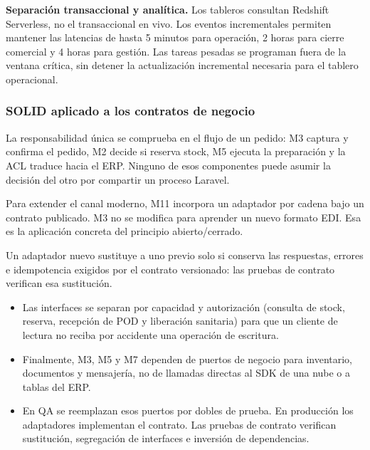 \textbf{Separación transaccional y analítica.} Los tableros consultan Redshift Serverless, no el transaccional en vivo. Los eventos incrementales permiten mantener las latencias de hasta 5 minutos para operación, 2 horas para cierre comercial y 4 horas para gestión. Las tareas pesadas se programan fuera de la ventana crítica, sin detener la actualización incremental necesaria para el tablero operacional.

\subsubsection{SOLID aplicado a los contratos de negocio}

La responsabilidad única se comprueba en el flujo de un pedido: M3 captura y confirma el pedido, M2 decide si reserva stock, M5 ejecuta la preparación y la ACL traduce hacia el ERP. Ninguno de esos componentes puede asumir la decisión del otro por compartir un proceso Laravel.

Para extender el canal moderno, M11 incorpora un adaptador por cadena bajo un contrato publicado. M3 no se modifica para aprender un nuevo formato EDI. Esa es la aplicación concreta del principio abierto/cerrado.

Un adaptador nuevo sustituye a uno previo solo si conserva las respuestas, errores e idempotencia exigidos por el contrato versionado: las pruebas de contrato verifican esa sustitución.

\begin{itemize}
  \item Las interfaces se separan por capacidad y autorización (consulta de stock, reserva, recepción de POD y liberación sanitaria) para que un cliente de lectura no reciba por accidente una operación de escritura.
  \item Finalmente, M3, M5 y M7 dependen de puertos de negocio para inventario, documentos y mensajería, no de llamadas directas al SDK de una nube o a tablas del ERP.
  \item En QA se reemplazan esos puertos por dobles de prueba. En producción los adaptadores implementan el contrato. Las pruebas de contrato verifican sustitución, segregación de interfaces e inversión de dependencias.
\end{itemize}
